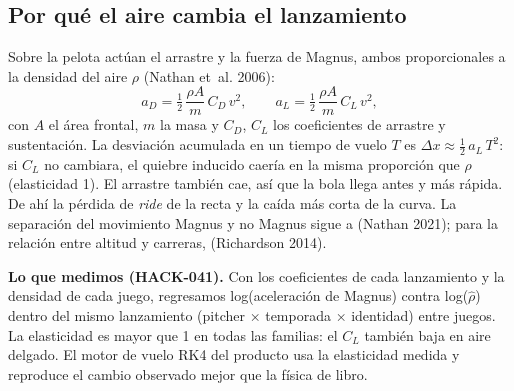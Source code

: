 \documentclass[
  english,
  spanish,
  10pt,
  letterpaper,
]{article}
\begin{document}
\subsection{Por qué el aire cambia el
lanzamiento}\label{por-quuxe9-el-aire-cambia-el-lanzamiento}

Sobre la pelota actúan el arrastre y la fuerza de Magnus, ambos
proporcionales a la densidad del aire \(\rho\) (Nathan et~al. 2006):
\[a_D = \tfrac{1}{2}\,\frac{\rho A}{m}\,C_D\,v^2, \qquad a_L = \tfrac{1}{2}\,\frac{\rho A}{m}\,C_L\,v^2,\]
con \(A\) el área frontal, \(m\) la masa y \(C_D\), \(C_L\) los
coeficientes de arrastre y sustentación. La desviación acumulada en un
tiempo de vuelo \(T\) es \(\Delta x \approx \tfrac{1}{2}\,a_L\,T^2\): si
\(C_L\) no cambiara, el quiebre inducido caería en la misma proporción
que \(\rho\) (elasticidad 1). El arrastre también cae, así que la bola
llega antes y más rápida. De ahí la pérdida de \emph{ride} de la recta y
la caída más corta de la curva. La separación del movimiento Magnus y no
Magnus sigue a (Nathan 2021); para la relación entre altitud y carreras,
(Richardson 2014).

\textbf{Lo que medimos (HACK-041).} Con los coeficientes de cada
lanzamiento y la densidad de cada juego, regresamos log(aceleración de
Magnus) contra log(\(\hat\rho\)) dentro del mismo lanzamiento (pitcher ×
temporada × identidad) entre juegos. La elasticidad es mayor que 1 en
todas las familias: el \(C_L\) también baja en aire delgado. El motor de
vuelo RK4 del producto usa la elasticidad medida y reproduce el cambio
observado mejor que la física de libro.
\end{document}

